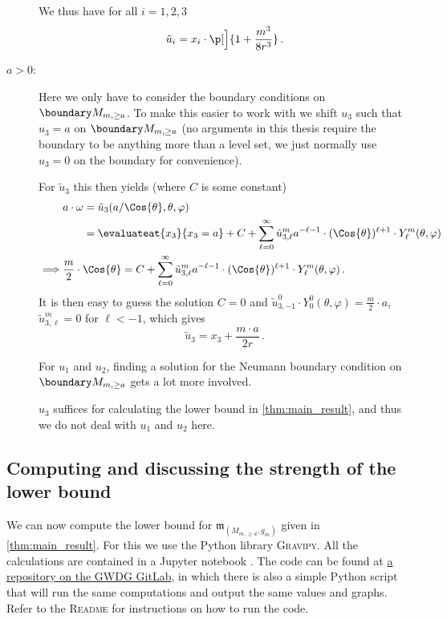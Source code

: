 \documentclass[titlepage,numbers=noenddot,oneside,%
cleardoublepage=empty,paper=a4,fontsize=11pt,%
english,%
]{scrartcl}
\newcommand*{\mathfullstop}{\,.}
\newcommand{\mass}[2]{\mathfrak{m}_{(#1,#2)}} %
\begin{document}
\begin{description}
    We thus have for all \( i=1,2,3 \)
    \begin{equation*}
        \tilde{u}_i=x_i\cdot \p[\Big]{1+\frac{m^3}{8r^3}}\mathfullstop
    \end{equation*}
    \item[\( a>0 \):] Here we only have to consider the boundary conditions on \( \modifiedschwarzschildboundary \). To make this easier to work with we shift \( u_3 \) such that \( u_3=a \) on \( \modifiedschwarzschildboundary \) (no arguments in this thesis require the boundary to be anything more than a level set, we just normally use \( u_3=0 \) on the boundary for convenience).
    
    For \( \tilde{u}_3 \) this then yields (where \( C \) is some constant)
    \begin{align*}
        &\begin{aligned}[t]
            a\cdot \omega&=\tilde{u}_3(a/\Cos{\theta},\theta,\varphi)\\
            &=\evaluateat{x_3}{x_3=a}+C+\sum_{\ell=0}^{\infty}\tilde{u}_{3,\ell}^m a^{-\ell-1}\cdot (\Cos{\theta})^{\ell+1}\cdot Y^m_{\ell}(\theta,\varphi)
        \end{aligned}\\
        \implies &\frac{m}{2}\cdot \Cos{\theta}=C+\sum_{\ell=0}^{\infty}\tilde{u}_{3,\ell}^m a^{-\ell-1}\cdot (\Cos{\theta})^{\ell+1}\cdot Y^m_{\ell}(\theta,\varphi)\mathfullstop
    \end{align*}
    It is then easy to guess the solution \( C=0 \) and \( \tilde{u}_{3,-1}^0\cdot Y_0^0(\theta,\varphi)=\frac{m}{2}\cdot a \), \( \tilde{u}_{3,\ell}^m=0 \) for \( \ell< -1 \), which gives
    \begin{equation*}
        \tilde{u}_3=x_3+\frac{m\cdot a}{2 r}\mathfullstop
    \end{equation*}

    For \( u_1 \) and \( u_2 \), finding a solution for the Neumann boundary condition on \( \modifiedschwarzschildboundary \) gets a lot more involved.

     \( u_3 \) suffices for calculating the lower bound in \cref{thm:main_result}, and thus we do not deal with \( u_1 \) and \( u_2 \) here. %
\end{description}
\subsection{Computing and discussing the strength of the lower bound}
We can now compute the lower bound for \( \mass{M_{m,\geq a}}{g_m} \) given in \cref{thm:main_result}. For this we use the Python library \textsc{Gravipy}. All the calculations are contained in a Jupyter notebook \cite{fischerhenryrubenHarmonicFunctionMethod2023}. The code can be found at \href{https://gitlab.gwdg.de/henryruben.fischer/bachelor-thesis-harmonic-functions-and-mass-of-asymptotically-flat-half-spaces/-/blob/master/computations_and_graphs/computations_and_graphs.ipynb}{a repository on the GWDG GitLab}, in which there is also a simple Python script that will run the same computations and output the same values and graphs. Refer to the \textsc{Readme} for instructions on how to run the code.
\end{document}
